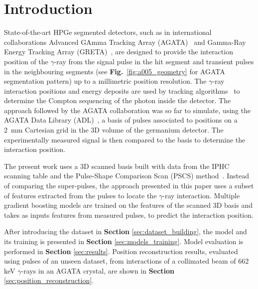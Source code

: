 \section{Introduction}
\label{sec:intro}
State-of-the-art HPGe segmented detectors, such as in international collaborations Advanced GAmma Tracking Array (AGATA)~\cite{Akkoyun2012} and Gamma-Ray Energy Tracking Array (GRETA)~\cite{Lee2003DevelopmentsArrays}, are designed to provide the interaction position of the $\gamma$-ray from the signal pulse in the hit segment and transient pulses in the neighbouring segments (see \textbf{Fig.}~\ref{fig:a005_geometry} for AGATA segmentation pattern) up to a millimetric position resolution. The $\gamma$-ray interaction positions and energy deposits are used by tracking algorithms~\cite{Bazzacco:2004nnw,Lopez-Martens2004}  to determine the Compton sequencing of the photon inside the detector. The approach followed by the AGATA collaboration was so far to simulate, using the AGATA Data Library (ADL)~\cite{Bruyneel2016ADL}, a basis of pulses associated to positions on a 2~mm Cartesian grid in the 3D volume of the germanium detector. The experimentally measured signal is then compared to the basis to determine the interaction position.

The present work uses a 3D scanned basis built with data from the IPHC scanning table and the Pulse-Shape Comparison Scan (PSCS) method~\cite{Crespi2008}. Instead of comparing the super-pulses, the approach presented in this paper uses a subset of features extracted from the pulses to locate the $\gamma$-ray interaction. Multiple gradient boosting models are trained on the features of the scanned 3D basis and takes as inputs features from measured pulses, to predict the interaction position.

After introducing the dataset in \textbf{Section} \ref{sec:dataset_building}, the model and its training is presented in \textbf{Section }\ref{sec:models_training}. Model evaluation is performed in \textbf{Section} \ref{sec:results}. Position reconstruction results, evaluated using pulses of an unseen dataset, from interactions of a collimated beam of 662 keV $\gamma$-rays in an AGATA crystal, are shown in \textbf{Section} \ref{sec:position_reconstruction}.


